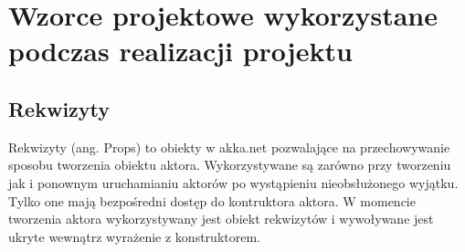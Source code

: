 \chapter{Wzorce projektowe wykorzystane podczas realizacji projektu}
\section{Rekwizyty}
Rekwizyty (ang. Props) to obiekty w akka.net pozwalające na przechowywanie sposobu tworzenia obiektu aktora. 
Wykorzystywane są zarówno przy tworzeniu jak i ponownym uruchamianiu aktorów po wystąpieniu nieobsłużonego wyjątku.
Tylko one mają bezpośredni dostęp do kontruktora aktora. W momencie tworzenia aktora wykorzystywany jest obiekt rekwizytów i wywoływane jest ukryte wewnątrz wyrażenie z konstruktorem.


